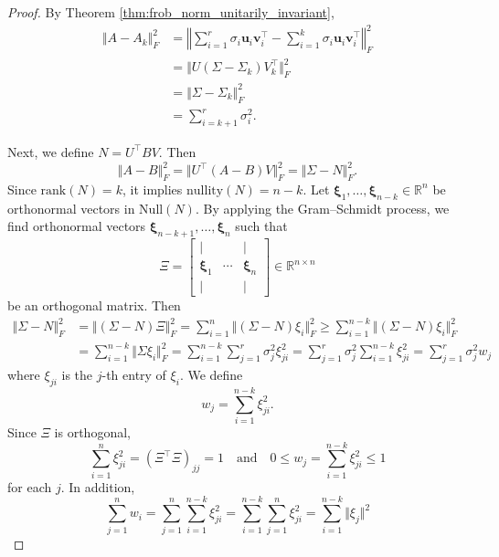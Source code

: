 \documentclass[12pt]{article}
\theoremstyle{definition}
\begin{document}
\begin{proof}
    By Theorem \ref{thm:frob_norm_unitarily_invariant},
    \begin{align*}
        \Vert A-A_k \Vert_F^2 
        &= \left\Vert \sum_{i=1}^r \sigma_i \mathbf{u}_i \mathbf{v}_i^\top - \sum_{i=1}^k \sigma_i \mathbf{u}_i \mathbf{v}_i^\top \right\Vert_F^2 \\
        &= \Vert U (\Sigma-\Sigma_k) V^\top_k \Vert_F^2 \\
        &= \Vert \Sigma - \Sigma_k \Vert_F^2 \\
        &= \sum_{i=k+1}^r \sigma_i^2.
    \end{align*}
     
    Next, we define $N = U^\top BV$. Then 
    \[ \Vert A-B \Vert_F^2
    = \Vert U^\top (A-B) V \Vert_F^2
    = \Vert \Sigma - N \Vert_F^2. 
    \]
    Since $\mathrm{rank}(N)=k$, it implies $\mathrm{nullity}(N)=n-k$. 
    Let $\mathbf{\xi}_1, \ldots, \mathbf{\xi}_{n-k} \in\mathbb{R}^n$ be orthonormal vectors in $\mathrm{Null}(N)$. By applying the Gram–Schmidt process, we find orthonormal vectors $\mathbf{\xi}_{n-k+1}, \ldots, \mathbf{\xi}_n$ such that 
    \[ \Xi =
    \begin{bmatrix}
        | &   & | \\
        \mathbf{\xi}_1 & \cdots & \mathbf{\xi}_n \\
        | &   & |
    \end{bmatrix} 
    \in \mathbb{R}^{n\times n}
    \]
    be an orthogonal matrix. Then 
    \begin{align*}
        \Vert \Sigma-N \Vert_F^2
        &= \Vert (\Sigma-N)\Xi \Vert_F^2 
        = \sum_{i=1}^n{\Vert(\Sigma-N)\xi_i\Vert_F^2} 
        \geq \sum_{i=1}^{n-k}{\Vert(\Sigma-N)\xi_i\Vert_F^2} \\
        &= \sum_{i=1}^{n-k}{\Vert\Sigma\xi_i\Vert_F^2} 
        = \sum_{i=1}^{n-k}\sum_{j=1}^r{\sigma_j^2\xi_{ji}^2} 
        = \sum_{j=1}^r{\sigma_j^2}\sum_{i=1}^{n-k}{\xi_{ji}^2} 
        = \sum_{j=1}^r{\sigma_j^2w_j}       
    \end{align*}
    where $\xi_{ji}$ is the $j$-th entry of $\xi_i$. We define 
    \[ w_j = \sum_{i=1}^{n-k} \xi_{ji}^2. \]
    Since $\Xi$ is orthogonal, 
    \[ \sum_{i=1}^{n}{\xi_{ji}^2} = (\Xi^\top\Xi)_{jj}=1
    \quad\text{and}\quad
    0 \leq w_j = \sum_{i=1}^{n-k}{\xi_{ji}^2} \leq 1 \]
    for each $j$. In addition,
    \[ \sum_{j=1}^n{w_i} 
    = \sum_{j=1}^n\sum_{i=1}^{n-k}{\xi_{ji}^2} 
    = \sum_{i=1}^{n-k}\sum_{j=1}^n{\xi_{ji}^2}
    = \sum_{i=1}^{n-k}\Vert\xi_j\Vert^2
\]
\end{proof}
\end{document}
